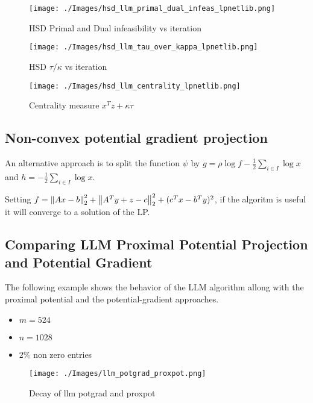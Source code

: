 \documentclass[smallextended]{article}       %
\begin{document}
\begin{figure}[h]
  \begin{center}
    \texttt{[image: ./Images/hsd\_llm\_primal\_dual\_infeas\_lpnetlib.png]}
  \end{center}
  \caption{HSD Primal and Dual infeasibility vs iteration}
  \label{fig:hsd_pd_infeas_lpnetlib}
\end{figure}

\begin{figure}[h]
  \begin{center}
    \texttt{[image: ./Images/hsd\_llm\_tau\_over\_kappa\_lpnetlib.png]}
  \end{center}
  \caption{HSD $\tau/\kappa$ vs iteration}
  \label{fig:hsd_tau_kappa_lpnetlib}
\end{figure}

\begin{figure}[h]
  \begin{center}
    \texttt{[image: ./Images/hsd\_llm\_centrality\_lpnetlib.png]}
  \end{center}
  \caption{Centrality measure $x^Tz+\kappa\tau$}
  \label{fig:hsd_centrality_lpnetlib}
\end{figure}



\subsection{Non-convex potential gradient projection}
An alternative approach is to split the function $\psi$ 
by $g=\rho\log{f} - \frac{1}{2}\sum_{i\in I}\log{x}$ and
$h = - \frac{1}{2}\sum_{i\in I}\log{x}$.

Setting $f = \left\| Ax-b \right\|_2^2+\left\| A^Ty+z-c \right\|_2^2+(c^Tx-b^Ty)^2$, 
if the algoritm is useful it will converge to a solution of the LP.

\subsection{Comparing LLM Proximal Potential Projection and Potential Gradient}

The following example shows the behavior of the LLM algorithm allong with 
the proximal potential and the potential-gradient approaches.
\begin{itemize}
  \item $m=524$
    \item $n=1028$
      \item $2\%$ non zero entries 
\end{itemize}

\begin{figure}[h]
  \begin{center}
    \texttt{[image: ./Images/llm\_potgrad\_proxpot.png]}
  \end{center}
  \caption{Decay of llm potgrad and proxpot}
  \label{fig:llm_potgrad_proxpot}
\end{figure}

\begin{comment}
Generated by experiment compare_llm_proxpot_potgrad.m
\end{comment}
\end{document}
